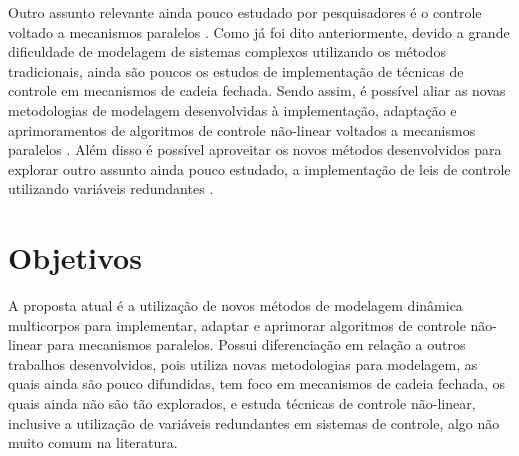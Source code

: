 \documentclass[a4paper,11pt,brazil,fleqn]{article}
\begin{document}
	Outro assunto relevante ainda pouco estudado por pesquisadores \'e o controle voltado a mecanismos paralelos \cite{Merlet2002}. Como j\'a foi dito anteriormente, devido a grande dificuldade de modelagem de sistemas complexos utilizando os m\'etodos tradicionais, ainda s\~ao poucos os estudos de implementa\c{c}\~ao de t\'ecnicas de controle em mecanismos de cadeia fechada. Sendo assim, \'e poss\'ivel aliar as novas metodologias de modelagem desenvolvidas \`a implementa\c{c}\~ao, adapta\c{c}\~ao e aprimoramentos de algoritmos de controle n\~ao-linear voltados a mecanismos paralelos \cite{Craig}. Al\'em disso \'e poss\'ivel aproveitar os novos m\'etodos desenvolvidos para explorar outro assunto ainda pouco estudado, a implementa\c{c}\~ao de leis de controle utilizando vari\'aveis redundantes \cite{ Rynaldo,Jarzebowska2009, Zubizarreta, Bloch}.


\section{Objetivos}\label{S02}

A proposta atual \'e a utiliza\c{c}\~ao de novos m\'etodos de modelagem din\^amica multicorpos para implementar, adaptar e aprimorar algoritmos de controle n\~ao-linear para mecanismos paralelos. Possui diferencia\c{c}\~ao em rela\c{c}\~ao a outros trabalhos desenvolvidos, pois utiliza novas metodologias para modelagem, as quais ainda s\~ao pouco difundidas, tem foco em mecanismos de cadeia fechada, os quais ainda n\~ao s\~ao t\~ao explorados, e estuda t\'ecnicas de controle n\~ao-linear, inclusive a utiliza\c{c}\~ao de vari\'aveis redundantes em sistemas de controle, algo n\~ao muito comum na literatura.
\end{document}
